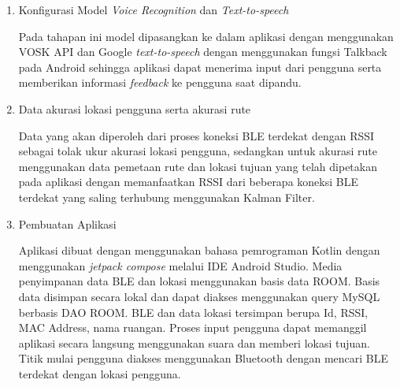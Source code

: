 	\begin{enumerate}
	
	\item Konfigurasi Model \textit{Voice Recognition} dan \textit{Text-to-speech}
	\par Pada tahapan ini model dipasangkan ke dalam aplikasi dengan menggunakan VOSK API dan Google \textit{text-to-speech} dengan menggunakan fungsi Talkback pada Android sehingga aplikasi dapat menerima input dari pengguna serta memberikan informasi \textit{feedback} ke pengguna saat dipandu.
	
	\newpage
	\item  Data akurasi lokasi pengguna serta akurasi rute
\par Data yang akan diperoleh dari proses koneksi BLE terdekat dengan RSSI sebagai tolak ukur akurasi lokasi pengguna, sedangkan untuk akurasi rute menggunakan data pemetaan rute dan lokasi tujuan yang telah dipetakan pada aplikasi dengan memanfaatkan RSSI dari beberapa koneksi BLE terdekat yang saling terhubung menggunakan Kalman Filter.

	\item Pembuatan Aplikasi
	\par Aplikasi dibuat dengan menggunakan bahasa pemrograman Kotlin dengan menggunakan \textit{jetpack compose} melalui IDE Android Studio. Media penyimpanan data BLE dan lokasi menggunakan basis data ROOM. Basis data disimpan secara lokal dan dapat diakses menggunakan query MySQL berbasis DAO ROOM. BLE dan data lokasi tersimpan berupa Id, RSSI, MAC Address, nama ruangan. Proses input pengguna dapat memanggil aplikasi secara langsung menggunakan suara dan memberi lokasi tujuan. Titik mulai pengguna diakses menggunakan Bluetooth dengan mencari BLE terdekat dengan lokasi pengguna.
	

\end{enumerate}

